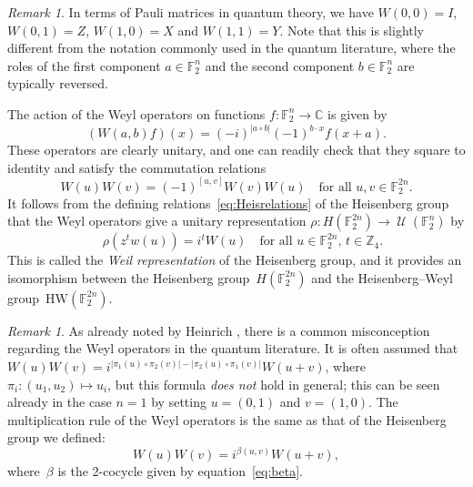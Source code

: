 \documentclass[11pt]{amsart}
\newcommand{\C}{\mathbb{C}} %
\newcommand{\Z}{\mathbb{Z}} %
\newcommand{\F}{\mathbb{F}} %
\newcommand{\HW}{\mathrm{HW}}
\DeclareMathOperator{\U}{\mathcal{U}}
\theoremstyle{plain}
\theoremstyle{definition}
\theoremstyle{remark}
\newtheorem{remark}[theorem]{Remark}
\begin{document}
\begin{remark}
    In terms of Pauli matrices in quantum theory, we have $W(0,0) = I$, $W(0,1) = Z$, $W(1,0) = X$ and $W(1,1) = Y$.
    Note that this is slightly different from the notation commonly used in the quantum literature, where the roles of the first component $a\in \F_2^n$ and the second component $b\in \F_2^n$ are typically reversed.
\end{remark}

The action of the Weyl operators on functions $f:\F_2^n\to \C$ is given by
\begin{equation*}
    (W(a,b)f)(x) = (-i)^{|a\circ b|}(-1)^{b\cdot x}f(x+a).
\end{equation*}
These operators are clearly unitary, and one can readily check that they square to identity and satisfy the commutation relations
\begin{equation} \label{eq:commutation_Weyl}
    W(u)W(v) = (-1)^{[u, v]} W(v) W(u) \quad \text{for all $u, v\in \F_2^{2n}$.}
\end{equation}
It follows from the defining relations~\eqref{eq:Heisrelations} of the Heisenberg group that the Weyl operators give a unitary representation $\rho: H(\F_2^{2n})\to \U(\F_2^n)$ by
\begin{equation} \label{eq:Weil}
    \quad \rho(z^t w(u)) = i^t W(u) \quad \text{for all $u\in \F_2^{2n}$, $t\in \Z_4$.}
\end{equation}
This is called the \emph{Weil representation} of the Heisenberg group, and it provides an isomorphism between the Heisenberg group~$H(\F_2^{2n})$ and the Heisenberg--Weyl group~$\HW(\F_2^{2n})$.

\begin{remark}
    As already noted by Heinrich \cite[Chapter~2]{heinrich2021}, there is a common misconception regarding the Weyl operators in the quantum literature.
    It is often assumed that
    $W(u) W(v) = i^{|\pi_1(u)\circ \pi_2(v)| - |\pi_2(u)\circ \pi_1(v)|} W(u+v)$, where $\pi_i: (u_1,u_2) \mapsto u_i$, but this formula \emph{does not} hold in general;
    this can be seen already in the case $n = 1$ by setting $u=(0,1)$ and $v=(1,0)$.
    The multiplication rule of the Weyl operators is the same as that of the Heisenberg group we defined:
    \begin{equation} \label{eq:Weyl_multiplication}
        W(u) W(v) = i^{\beta(u,v)} W(u+v),
    \end{equation}
    where~$\beta$ is the 2-cocycle given by equation~\eqref{eq:beta}.
\end{remark}
\end{document}
